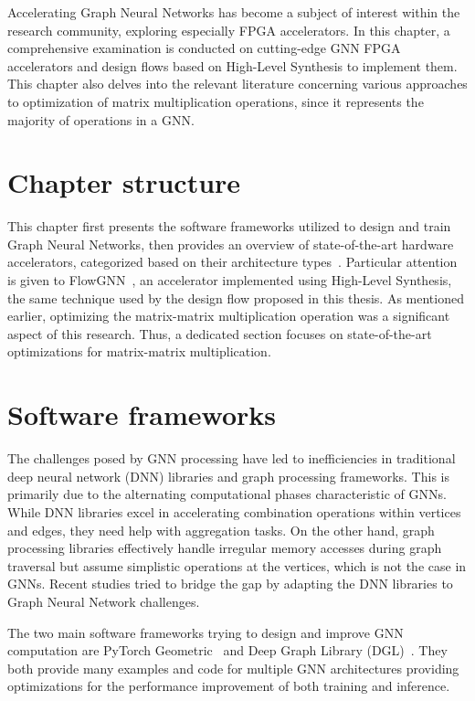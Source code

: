 Accelerating Graph Neural Networks has become a subject of interest within the research community, exploring especially FPGA accelerators.
In this chapter, a comprehensive examination is conducted on cutting-edge GNN FPGA accelerators and design flows based on High-Level Synthesis to implement them.
This chapter also delves into the relevant literature concerning various approaches to optimization of matrix multiplication operations, since it represents the majority of operations in a GNN.

\section{Chapter structure}
\label{sec:related_work_structure}%
This chapter first presents the software frameworks utilized to design and train Graph Neural Networks, then provides an overview of state-of-the-art hardware accelerators, categorized based on their architecture types~\cite{DBLP:journals/corr/abs-2010-00130}.
Particular attention is given to FlowGNN~\cite{sarkar2022flowgnn}, an accelerator implemented using High-Level Synthesis, the same technique used by the design flow proposed in this thesis.
As mentioned earlier, optimizing the matrix-matrix multiplication operation was a significant aspect of this research.
Thus, a dedicated section focuses on state-of-the-art optimizations for matrix-matrix multiplication.

\section{Software frameworks}
\label{sec:related_work_software_frameworks}%

The challenges posed by GNN processing have led to inefficiencies in traditional deep neural network (DNN) libraries and graph processing frameworks.
This is primarily due to the alternating computational phases characteristic of GNNs.
While DNN libraries excel in accelerating combination operations within vertices and edges, they need help with aggregation tasks.
On the other hand, graph processing libraries effectively handle irregular memory accesses during graph traversal but assume simplistic operations at the vertices, which is not the case in GNNs.
Recent studies tried to bridge the gap by adapting the DNN libraries to Graph Neural Network challenges.

The two main software frameworks trying to design and improve GNN computation are PyTorch Geometric~\cite{DBLP:journals/corr/abs-1903-02428} and Deep Graph Library (DGL)~\cite{DBLP:journals/corr/abs-1909-01315}.
They both provide many examples and code for multiple GNN architectures providing optimizations for the performance improvement of both training and inference.


